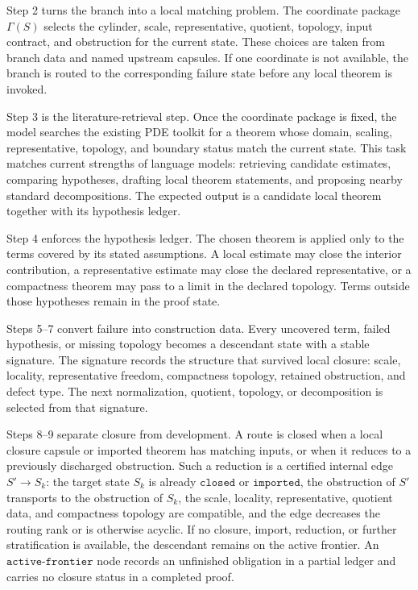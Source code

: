 \documentclass[11pt]{article}
\theoremstyle{plain}
\theoremstyle{definition}
\theoremstyle{remark}
\begin{document}
Step 2 turns the branch into a local matching problem.  The coordinate package
\(\Gamma(S)\) selects the cylinder, scale, representative, quotient,
topology, input contract, and obstruction for the current state.  These choices
are taken from branch data and named upstream capsules.  If one coordinate is
not available, the branch is routed to the corresponding failure state before
any local theorem is invoked.

Step 3 is the literature-retrieval step.  Once the coordinate package is fixed,
the model searches the existing PDE toolkit for a theorem whose domain,
scaling, representative, topology, and boundary status match the current
state.  This task matches current strengths of language models: retrieving
candidate estimates, comparing hypotheses, drafting local theorem statements,
and proposing nearby standard decompositions.  The expected output is a
candidate local theorem together with its hypothesis ledger.

Step 4 enforces the hypothesis ledger.  The chosen theorem is applied only to
the terms covered by its stated assumptions.  A local estimate may close the
interior contribution, a representative estimate may close the declared
representative, or a compactness theorem may pass to a limit in the declared
topology.  Terms outside those hypotheses remain in the proof state.

Steps 5--7 convert failure into construction data.  Every uncovered term,
failed hypothesis, or missing topology becomes a descendant state with a stable
signature.  The signature records the structure that survived local closure:
scale, locality, representative freedom, compactness topology, retained
obstruction, and defect type.  The next normalization, quotient, topology, or
decomposition is selected from that signature.

Steps 8--9 separate closure from development.  A route is closed when a local
closure capsule or imported theorem has matching inputs, or when it reduces to
a previously discharged obstruction.  Such a reduction is a
certified internal edge \(S'\to S_k\): the target state \(S_k\) is already
\(\texttt{closed}\) or \(\texttt{imported}\), the obstruction of \(S'\)
transports to the obstruction of \(S_k\), the scale, locality, representative,
quotient data, and compactness topology are compatible, and the
edge decreases the routing rank or is otherwise acyclic.  If no closure,
import, reduction, or further stratification is available, the descendant
remains on the active frontier.  An \(\texttt{active-frontier}\) node records
an unfinished obligation in a partial ledger and carries no closure status in a
completed proof.
\end{document}
